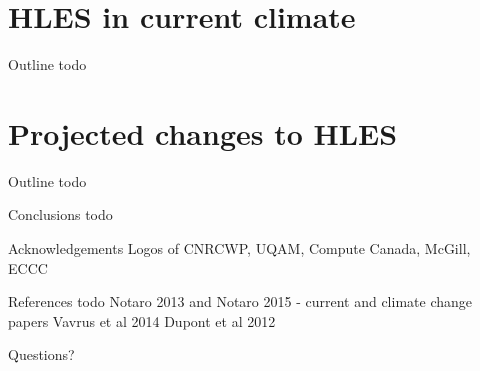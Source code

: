 \documentclass{beamer}
\begin{document}
  \section{HLES in current climate}
  \begin{frame}{Outline}
    todo
  \end{frame}


  \section{Projected changes to HLES}
  \begin{frame}{Outline}
    todo
  \end{frame}


  \begin{frame}{Conclusions}
    todo
  \end{frame}

  \begin{frame}{Acknowledgements}
      Logos of CNRCWP, UQAM, Compute Canada, McGill, ECCC
  \end{frame}


  \begin{frame}{References}
    todo
    Notaro 2013 and Notaro 2015 - current and climate change papers
    Vavrus et al 2014
    Dupont et al 2012
  \end{frame}

  \begin{frame}[standout]
    Questions?
  \end{frame}

\appendix
\end{document}

